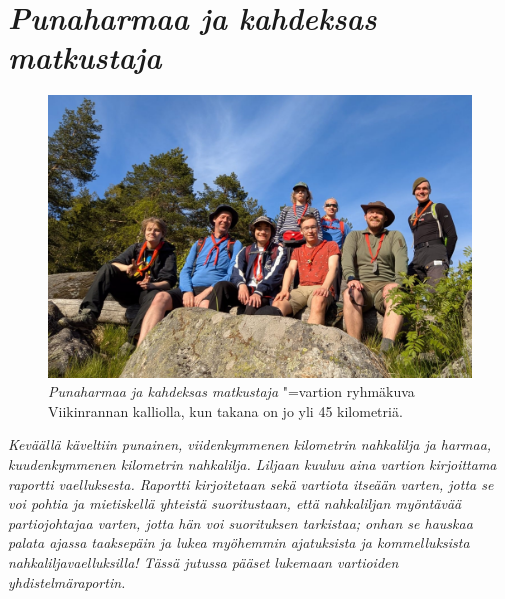 \section{\textit{Punaharmaa ja kahdeksas matkustaja}}

\thispagestyle{empty}

\begin{figure}[!h]
\centering\includegraphics[width=\textwidth]{assets/liljaryhma.jpg}
\caption{\textit{Punaharmaa ja kahdeksas matkustaja} "=vartion ryhmäkuva 
Viikinrannan kalliolla, kun takana on jo yli 45 kilometriä.}
\end{figure}

\noindent\textit{Keväällä käveltiin punainen, viidenkymmenen kilometrin 
nahkalilja ja harmaa, kuudenkymmenen kilometrin nahkalilja. Liljaan kuuluu aina 
vartion kirjoittama raportti vaelluksesta. Raportti kirjoitetaan sekä vartiota 
itseään varten, jotta se voi pohtia ja mietiskellä yhteistä suoritustaan, 
että nahkaliljan myöntävää partiojohtajaa varten, jotta hän voi 
suorituksen tarkistaa; onhan se hauskaa palata ajassa taaksepäin ja lukea 
myöhemmin ajatuksista ja kommelluksista nahkaliljavaelluksilla! Tässä 
jutussa pääset lukemaan vartioiden yhdistelmäraportin.}

